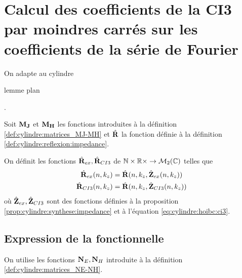 \section{Calcul des coefficients de la CI3 par moindres carrés sur les coefficients de la série de Fourier}

  On adapte au cylindre \begin{TODO}lemme plan\end{TODO}.

  Soit \(\mathbf{M}_{\mathbf{J}}\) et \(\mathbf{M}_{\mathbf{H}}\) les fonctions introduites à la définition \ref{def:cylindre:matrices_MJ-MH} et \(\hat{\mathbf{R}}\) la fonction définie à la définition \ref{def:cylindre:reflexion:impedance}.

  \begin{defn}%
    \label{def:cylindre:minimisation:matrices_MR}
    On définit les fonctions \(\hat{\mathbf{R}}_{ex}, \hat{\mathbf{R}}_{CI3}\) de \(\mathbb N\times\mathbb R\times \rightarrow \mathcal{M}_2(\mathbb C)\) telles que
    \begin{align*}
      \hat{\mathbf{R}}_{ex}(n,k_z) &= \hat{\mathbf{R}}(n,k_z, \hat{\mathbf{Z}}_{ex}(n,k_z))
      \\
      \hat{\mathbf{R}}_{CI3}(n,k_z) &= \hat{\mathbf{R}}(n,k_z, \hat{\mathbf{Z}}_{CI3}(n,k_z))
    \end{align*}
    où \(\hat{\mathbf{Z}}_{ex},\hat{\mathbf{Z}}_{CI3}\) sont des fonctions définies à la proposition \ref{prop:cylindre:synthese:impedance} et à l'équation \eqref{eq:cylindre:hoibc:ci3}.
  \end{defn}

  \subsection{Expression de la fonctionnelle}

    On utilise les fonctions \(\mathbf{N}_E, \mathbf{N}_H\) introduite à la définition \ref{def:cylindre:matrices_NE-NH}.

